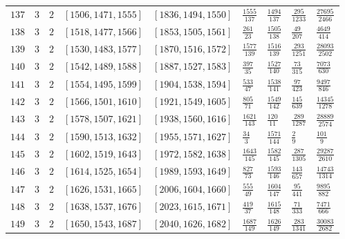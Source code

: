 \documentclass[12pt]{extarticle}
\begin{document}
\begin{longtable}{lllllllll}
$137$ & $3$ & $2$ & $\left[1506, 1471, 1555\right]$ & $\left[1836, 1494, 1550\right]$ & $\frac{1555}{137}$ & $\frac{1494}{137}$ & $\frac{295}{1233}$ & $\frac{27695}{2466}$ \\
$138$ & $3$ & $2$ & $\left[1518, 1477, 1566\right]$ & $\left[1853, 1505, 1561\right]$ & $\frac{261}{23}$ & $\frac{1505}{138}$ & $\frac{49}{207}$ & $\frac{4649}{414}$ \\
$139$ & $3$ & $2$ & $\left[1530, 1483, 1577\right]$ & $\left[1870, 1516, 1572\right]$ & $\frac{1577}{139}$ & $\frac{1516}{139}$ & $\frac{293}{1251}$ & $\frac{28093}{2502}$ \\
$140$ & $3$ & $2$ & $\left[1542, 1489, 1588\right]$ & $\left[1887, 1527, 1583\right]$ & $\frac{397}{35}$ & $\frac{1527}{140}$ & $\frac{73}{315}$ & $\frac{7073}{630}$ \\
$141$ & $3$ & $2$ & $\left[1554, 1495, 1599\right]$ & $\left[1904, 1538, 1594\right]$ & $\frac{533}{47}$ & $\frac{1538}{141}$ & $\frac{97}{423}$ & $\frac{9497}{846}$ \\
$142$ & $3$ & $2$ & $\left[1566, 1501, 1610\right]$ & $\left[1921, 1549, 1605\right]$ & $\frac{805}{71}$ & $\frac{1549}{142}$ & $\frac{145}{639}$ & $\frac{14345}{1278}$ \\
$143$ & $3$ & $2$ & $\left[1578, 1507, 1621\right]$ & $\left[1938, 1560, 1616\right]$ & $\frac{1621}{143}$ & $\frac{120}{11}$ & $\frac{289}{1287}$ & $\frac{28889}{2574}$ \\
$144$ & $3$ & $2$ & $\left[1590, 1513, 1632\right]$ & $\left[1955, 1571, 1627\right]$ & $\frac{34}{3}$ & $\frac{1571}{144}$ & $\frac{2}{9}$ & $\frac{101}{9}$ \\
$145$ & $3$ & $2$ & $\left[1602, 1519, 1643\right]$ & $\left[1972, 1582, 1638\right]$ & $\frac{1643}{145}$ & $\frac{1582}{145}$ & $\frac{287}{1305}$ & $\frac{29287}{2610}$ \\
$146$ & $3$ & $2$ & $\left[1614, 1525, 1654\right]$ & $\left[1989, 1593, 1649\right]$ & $\frac{827}{73}$ & $\frac{1593}{146}$ & $\frac{143}{657}$ & $\frac{14743}{1314}$ \\
$147$ & $3$ & $2$ & $\left[1626, 1531, 1665\right]$ & $\left[2006, 1604, 1660\right]$ & $\frac{555}{49}$ & $\frac{1604}{147}$ & $\frac{95}{441}$ & $\frac{9895}{882}$ \\
$148$ & $3$ & $2$ & $\left[1638, 1537, 1676\right]$ & $\left[2023, 1615, 1671\right]$ & $\frac{419}{37}$ & $\frac{1615}{148}$ & $\frac{71}{333}$ & $\frac{7471}{666}$ \\
$149$ & $3$ & $2$ & $\left[1650, 1543, 1687\right]$ & $\left[2040, 1626, 1682\right]$ & $\frac{1687}{149}$ & $\frac{1626}{149}$ & $\frac{283}{1341}$ & $\frac{30083}{2682}$ \\

\end{longtable}
\end{document}
